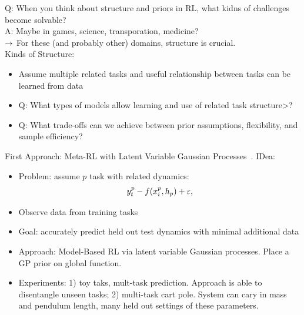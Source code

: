 Q: When you think about structure and priors in RL, what kidns of challenges become solvable? \\

A: Maybe in games, science, transporation, medicine? \\

$\rightarrow$ For these (and probably other) domains, structure is crucial. \\


Kinds of Structure:
\begin{itemize}
    \item Assume multiple related tasks and useful relationship between tasks can be learned from data
    \item Q: What types of models allow learning and use of related task structure>?
    \item Q: What trade-offs can we achieve between prior assumptions, flexibility, and sample efficiency?
\end{itemize}

First Approach: Meta-RL with Latent Variable Gaussian Processes~\cite{saemundsson2018meta}. IDea:
\begin{itemize}
    \item Problem: assume $p$ task with related dynamics:
    \begin{equation}
        y_t^p - f(x_i^p, h_p) + \varepsilon,
    \end{equation}
    \item Observe data from training tasks
    \item Goal: accurately predict held out test dynamics with minimal additional data

    \item Approach: Model-Based RL via latent variable Gaussian processes. Place a GP prior on global function.
    
    \item Experiments: 1) toy taks, mult-task prediction. Approach is able to disentangle unseen tasks; 2) multi-task cart pole. System can cary in mass and pendulum length, many held out settings of these parameters.
\end{itemize}

